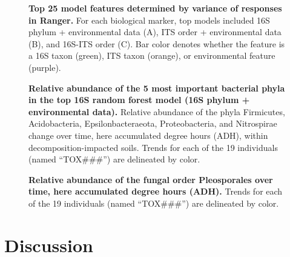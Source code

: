 \documentclass[
  10pt,
  letterpaper,
]{article}
\begin{document}
\begin{figure}[!h]
\caption{{\bf Top 25 model features determined by variance of responses in Ranger.}
For each biological marker, top models included 16S phylum + environmental data (A), ITS order + environmental data (B), and 16S-ITS order (C). Bar color denotes whether the feature is a 16S taxon (green), ITS taxon (orange), or environmental feature (purple).}
\label{fig5}
\end{figure}

\begin{figure}[!h]
\caption{{\bf Relative abundance of the 5 most important bacterial phyla in the top 16S random forest model (16S phylum + environmental data).}
Relative abundance of the phyla Firmicutes, Acidobacteria, Epsilonbacteraeota, Proteobacteria, and Nitrospirae change over time, here accumulated degree hours (ADH), within decomposition-impacted soils. Trends for each of the 19 individuals (named “TOX\#\#\#”) are delineated by color.}
\label{fig6}
\end{figure}

\begin{figure}[!h]
\caption{{\bf Relative abundance of the fungal order Pleosporales over time, here accumulated degree hours (ADH).}
Trends for each of the 19 individuals (named “TOX\#\#\#”) are delineated by color.}
\label{fig7}
\end{figure}

\section{Discussion}\label{discussion}
\end{document}
